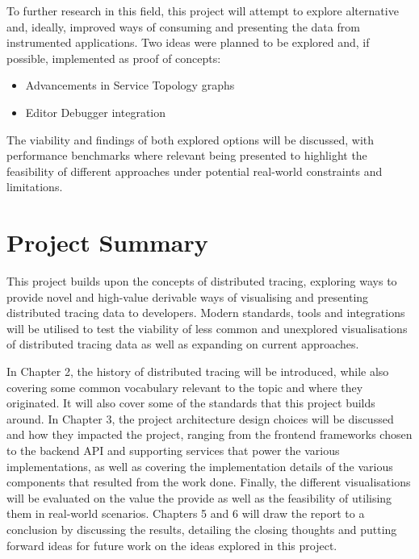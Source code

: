 \documentclass[12pt,pdftex,titlepage]{report}
\begin{document}
            To further research in this field, this project will attempt to explore alternative and, ideally, improved ways of consuming and presenting the data from instrumented
            applications. Two ideas were planned to be explored and, if possible, implemented as proof of concepts:

            \begin{itemize}
                \item Advancements in Service Topology graphs
                \item Editor Debugger integration                
            \end{itemize}

            The viability and findings of both explored options will be discussed, with performance benchmarks where relevant being presented to highlight the feasibility of different
            approaches under potential real-world constraints and limitations.

        \section{Project Summary}
            This project builds upon the concepts of distributed tracing, exploring ways to provide novel and high-value derivable ways of visualising and presenting distributed tracing
            data to developers. Modern standards, tools and integrations will be utilised to test the viability of less common and unexplored visualisations of distributed tracing data
            as well as expanding on current approaches.

            In Chapter 2, the history of distributed tracing will be introduced, while also covering some common vocabulary relevant to the topic and where they originated. It will also
            cover some of the standards that this project builds around. In Chapter 3, the project architecture design choices will be discussed and how they impacted the project, ranging
            from the frontend frameworks chosen to the backend API and supporting services that power the various implementations, as well as covering the implementation details of the various
            components that resulted from the work done. Finally, the different visualisations will be evaluated on the value the provide as well as the feasibility of utilising them in real-world
            scenarios. Chapters 5 and 6 will draw the report to a conclusion by discussing the results, detailing the closing thoughts and putting forward ideas for future work on the ideas explored 
            in this project.
\end{document}

